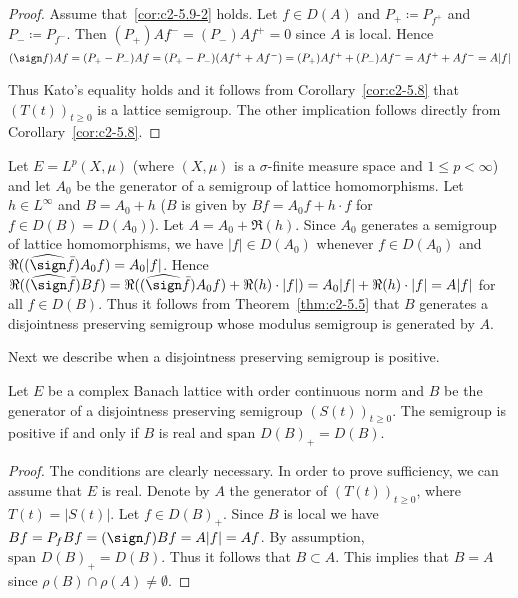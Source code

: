 \begin{proof}
Assume that~\ref{cor:c2-5.9-2}   holds. 
Let $f \in D(A)$ and $P_{+} \coloneqq P_{f^{+}}$ and $P_{-} \coloneqq P_{f^{-}}$.
Then $(P_{+})Af^{-} = (P_{-})Af^{+} = 0$ since $A$ is local. 
Hence $(\sign  f)Af = (P_{+} - P_{-})Af = (P_{+} - P_{-})(Af^{+} + Af^{-}) = 
(P_{+})Af^{+} + (P_{-})Af^{-} = Af^{+} + Af^{-} = A|f|$

Thus Kato's equality holds and it follows from Corollary~\ref{cor:c2-5.8}   that $(T(t))_{t \geq 0}$ is a lattice semigroup. The other implication follows directly from Corollary~\ref{cor:c2-5.8}.
\end{proof}
\begin{example}\label{ex:c2-5.10}
Let $E = L^{p}(X,\mu)$ (where $(X,\mu)$ is a $\sigma$-finite measure space and $1 \leq p < \infty$) and let $A_{0}$ be the generator of a semigroup of lattice homomorphisms. 
Let $h \in L^{\infty}$ and $B = A_{0} + h$ (\ie $B$ is given by $Bf = A_{0}f + h \cdot f$ for $f \in D(B) = D(A_{0})$). 
Let $A = A_{0} + \Re(h)$.
Since $A_{0}$ generates a semigroup of lattice homomorphisms, we have $|f| \in D(A_{0})$ whenever $f \in D(A_{0})$ and $\Re(( \widehat{\sign} \bar{f})A_{0}f) = A_{0}|f|$.
Hence $\Re((\widehat{\sign}  \bar{f})Bf) = \Re((\widehat{\sign}  \bar{f})A_{0}f) + \Re(h) \cdot |f|) = A_{0}|f| + \Re(h) \cdot |f| = A|f|$ for all $f \in D(B)$. 
Thus it follows from Theorem~\ref{thm:c2-5.5}   that $B$ generates a disjointness preserving semigroup whose modulus semigroup is generated by $A$.
\end{example}

Next we describe when a disjointness preserving semigroup is positive.

\begin{proposition}\label{prop:c2-5.11}
%
Let $E$ be a complex Banach lattice with order continuous norm and $B$ be the generator of a disjointness preserving semigroup $(S(t))_{t \geq 0}$. 
The semigroup is positive if and only if\/ $B$ is real and $\text{span } D(B)_{+} = D(B)$.
\end{proposition}

\begin{proof}
The conditions are clearly necessary. 
In order to prove sufficiency, we can assume that $E$ is real. 
Denote by $A$ the generator of\/ $(T(t))_{t \geq 0}$, where $T(t) = |S(t)|$. 
Let $f \in D(B)_{+}$. 
Since $B$ is local we have $Bf = P_{f}Bf = (\sign  f)Bf = A|f| = Af$. 
By assumption, $\text{span } D(B)_{+} = D(B)$. 
Thus it follows that $B \subset A$. 
This implies that $B = A$ since $\rho(B) \cap \rho(A) \neq \emptyset$.
\end{proof}

